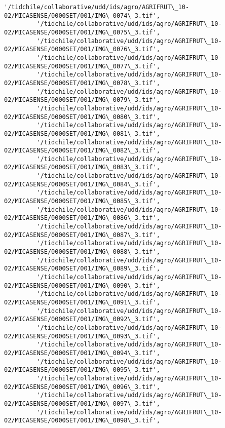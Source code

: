 \documentclass[11pt]{article}
\begin{document}
\begin{Verbatim}[commandchars=\\\{\}]
         '/tidchile/collaborative/udd/ids/agro/AGRIFRUT\_10-02/MICASENSE/0000SET/001/IMG\_0074\_3.tif',
         '/tidchile/collaborative/udd/ids/agro/AGRIFRUT\_10-02/MICASENSE/0000SET/001/IMG\_0075\_3.tif',
         '/tidchile/collaborative/udd/ids/agro/AGRIFRUT\_10-02/MICASENSE/0000SET/001/IMG\_0076\_3.tif',
         '/tidchile/collaborative/udd/ids/agro/AGRIFRUT\_10-02/MICASENSE/0000SET/001/IMG\_0077\_3.tif',
         '/tidchile/collaborative/udd/ids/agro/AGRIFRUT\_10-02/MICASENSE/0000SET/001/IMG\_0078\_3.tif',
         '/tidchile/collaborative/udd/ids/agro/AGRIFRUT\_10-02/MICASENSE/0000SET/001/IMG\_0079\_3.tif',
         '/tidchile/collaborative/udd/ids/agro/AGRIFRUT\_10-02/MICASENSE/0000SET/001/IMG\_0080\_3.tif',
         '/tidchile/collaborative/udd/ids/agro/AGRIFRUT\_10-02/MICASENSE/0000SET/001/IMG\_0081\_3.tif',
         '/tidchile/collaborative/udd/ids/agro/AGRIFRUT\_10-02/MICASENSE/0000SET/001/IMG\_0082\_3.tif',
         '/tidchile/collaborative/udd/ids/agro/AGRIFRUT\_10-02/MICASENSE/0000SET/001/IMG\_0083\_3.tif',
         '/tidchile/collaborative/udd/ids/agro/AGRIFRUT\_10-02/MICASENSE/0000SET/001/IMG\_0084\_3.tif',
         '/tidchile/collaborative/udd/ids/agro/AGRIFRUT\_10-02/MICASENSE/0000SET/001/IMG\_0085\_3.tif',
         '/tidchile/collaborative/udd/ids/agro/AGRIFRUT\_10-02/MICASENSE/0000SET/001/IMG\_0086\_3.tif',
         '/tidchile/collaborative/udd/ids/agro/AGRIFRUT\_10-02/MICASENSE/0000SET/001/IMG\_0087\_3.tif',
         '/tidchile/collaborative/udd/ids/agro/AGRIFRUT\_10-02/MICASENSE/0000SET/001/IMG\_0088\_3.tif',
         '/tidchile/collaborative/udd/ids/agro/AGRIFRUT\_10-02/MICASENSE/0000SET/001/IMG\_0089\_3.tif',
         '/tidchile/collaborative/udd/ids/agro/AGRIFRUT\_10-02/MICASENSE/0000SET/001/IMG\_0090\_3.tif',
         '/tidchile/collaborative/udd/ids/agro/AGRIFRUT\_10-02/MICASENSE/0000SET/001/IMG\_0091\_3.tif',
         '/tidchile/collaborative/udd/ids/agro/AGRIFRUT\_10-02/MICASENSE/0000SET/001/IMG\_0092\_3.tif',
         '/tidchile/collaborative/udd/ids/agro/AGRIFRUT\_10-02/MICASENSE/0000SET/001/IMG\_0093\_3.tif',
         '/tidchile/collaborative/udd/ids/agro/AGRIFRUT\_10-02/MICASENSE/0000SET/001/IMG\_0094\_3.tif',
         '/tidchile/collaborative/udd/ids/agro/AGRIFRUT\_10-02/MICASENSE/0000SET/001/IMG\_0095\_3.tif',
         '/tidchile/collaborative/udd/ids/agro/AGRIFRUT\_10-02/MICASENSE/0000SET/001/IMG\_0096\_3.tif',
         '/tidchile/collaborative/udd/ids/agro/AGRIFRUT\_10-02/MICASENSE/0000SET/001/IMG\_0097\_3.tif',
         '/tidchile/collaborative/udd/ids/agro/AGRIFRUT\_10-02/MICASENSE/0000SET/001/IMG\_0098\_3.tif',

\end{Verbatim}
\end{document}
